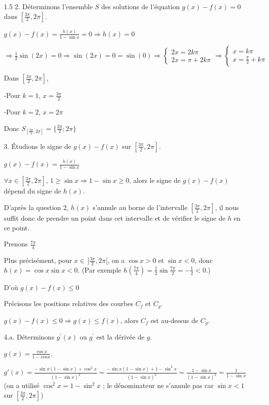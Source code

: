 \documentclass[12pt]{article}
\begin{document}
\begin{spacing}{1.5}
2. Déterminons l'ensemble $S$ des solutions de l'équation $g(x)-f(x)=0$ dans $[\frac{3\pi}{2},2\pi]$.

$g(x) - f(x)=\frac{h(x)}{1-\sin x}=0\Rightarrow h(x)=0$

$\Rightarrow \frac{1}{2}\sin(2x)=0\Rightarrow \sin(2x)=0=\sin(0)\Rightarrow \begin{cases}
2x=2k\pi\\
2x=\pi+2k\pi
\end{cases}\Rightarrow \begin{cases}
x=k\pi\\
x=\frac{\pi}{2}+k\pi
\end{cases}$

Dans $[\frac{3\pi}{2},2\pi]$,

-Pour $k=1$, $x=\frac{3\pi}{2}$

-Pour $k=2$, $x=2\pi$

Donc $S_{[\frac{3\pi}{2},2\pi]}=\{\frac{3\pi}{2};2\pi\}$


3. Étudions le signe de $g(x)-f(x)$ sur $[\frac{3\pi}{2},2\pi]$.

$g(x) - f(x)=\frac{h(x)}{1-\sin x}$

$\forall x\in [\frac{3\pi}{2},2\pi]$, $1\geq\sin x \Rightarrow 1-\sin x\geq 0$, alors le signe de $g(x)-f(x)$ dépend du signe de $h(x)$.

D'après la question 2, $h(x)$ s'annule au borne de l'intervalle $[\frac{3\pi}{2},2\pi]$, il nous suffit donc de prendre un point dans cet intervalle et de vérifier le signe de $h$ en ce point.

Prenons $\frac{7\pi}{4}$

Plus précisément, pour $x\in\,]\frac{3\pi}{2},2\pi[$, on a $\cos x>0$ et $\sin x<0$, donc $h(x)=\cos x\sin x<0$. (Par exemple $h(\frac{7\pi}{4})=\frac{1}{2}\sin\frac{7\pi}{2}=-\frac{1}{2}<0$.)

D'où $g(x) - f(x)\leq 0$

 Précisons les positions relatives des courbes $C_f$ et $C_g$.
 
 
 $g(x) - f(x)\leq 0\Rightarrow g(x)\leq f(x)$, alors $C_f$ est au-dessus de  $C_g$.

 

4.a. Déterminons $g^{\prime}(x)$ ou $g^{\prime}$ est la dérivée de $g$.

$g(x)=\frac{\cos x}{1 - sin x}$.

$g'(x)=\frac{-\sin x(1-\sin x)+\cos^2x}{(1-\sin x)^2}=\frac{-\sin x(1-\sin x)+1-\sin^2x}{(1-\sin x)^2}=\frac{1-\sin x}{(1-\sin x)^2}=\frac{1}{1-\sin x}$ (on a utilisé $\cos^2x=1-\sin^2x$ ; le dénominateur ne s'annule pas car $\sin x<1$ sur $[\frac{3\pi}{2},2\pi]$)


\end{spacing}
\end{document}
